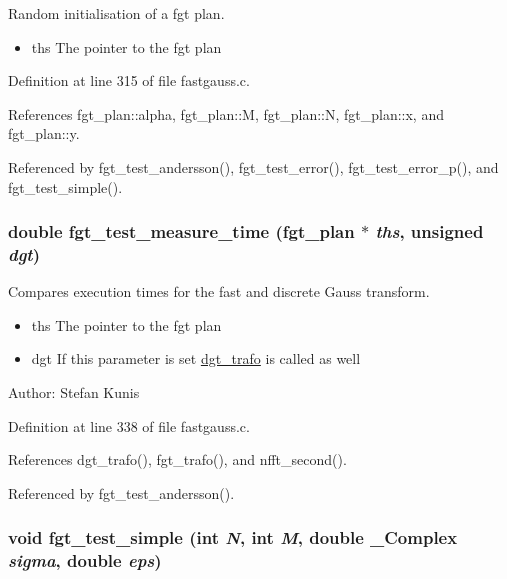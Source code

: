 Random initialisation of a fgt plan. 

\begin{itemize}
\item ths The pointer to the fgt plan 
\end{itemize}


Definition at line 315 of file fastgauss.c.

References fgt\_\-plan::alpha, fgt\_\-plan::M, fgt\_\-plan::N, fgt\_\-plan::x, and fgt\_\-plan::y.

Referenced by fgt\_\-test\_\-andersson(), fgt\_\-test\_\-error(), fgt\_\-test\_\-error\_\-p(), and fgt\_\-test\_\-simple().\hypertarget{group__applications__fastgauss_gbebca8cc0714b36c3b47e2a5d0317960}{
\subsubsection{\setlength{\rightskip}{0pt plus 5cm}double fgt\_\-test\_\-measure\_\-time ({\bf fgt\_\-plan} $\ast$ {\em ths}, unsigned {\em dgt})}}
\label{group__applications__fastgauss_gbebca8cc0714b36c3b47e2a5d0317960}


Compares execution times for the fast and discrete Gauss transform. 

\begin{itemize}
\item ths The pointer to the fgt plan \item dgt If this parameter is set \hyperlink{group__applications__fastgauss_g42f141fc768ced46eb2dac284b063b80}{dgt\_\-trafo} is called as well\end{itemize}
\begin{Desc}
\item[Author:]Stefan Kunis \end{Desc}


Definition at line 338 of file fastgauss.c.

References dgt\_\-trafo(), fgt\_\-trafo(), and nfft\_\-second().

Referenced by fgt\_\-test\_\-andersson().\hypertarget{group__applications__fastgauss_g74b5dd8d6f593462a2b37b290ad4d227}{
\subsubsection{\setlength{\rightskip}{0pt plus 5cm}void fgt\_\-test\_\-simple (int {\em N}, int {\em M}, double \_\-Complex {\em sigma}, double {\em eps})}}
\label{group__applications__fastgauss_g74b5dd8d6f593462a2b37b290ad4d227}


